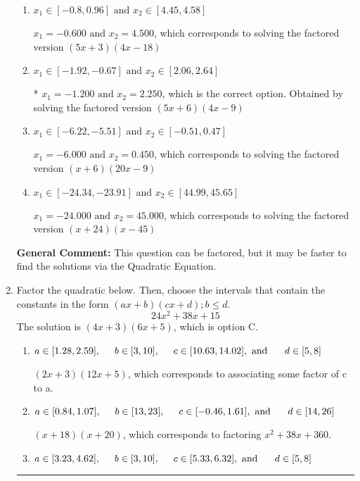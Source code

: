 \documentclass{extbook}[14pt]
\newcommand{\litem}[1]{\item #1

\rule{\textwidth}{0.4pt}}
\begin{document}
\begin{enumerate}
{\begin{enumerate}[label=\Alph*.]
$x_1 = -3.600 \text{ and } x_2 = 0.750$, which corresponds to solving the factored version $(5x + 18)(4x -3)$
\item \( x_1 \in [-0.8, 0.96] \text{ and } x_2 \in [4.45, 4.58] \)

$x_1 = -0.600 \text{ and } x_2 = 4.500$, which corresponds to solving the factored version $(5x + 3)(4x -18)$
\item \( x_1 \in [-1.92, -0.67] \text{ and } x_2 \in [2.06, 2.64] \)

* $x_1 = -1.200 \text{ and } x_2 = 2.250$, which is the correct option. Obtained by solving the factored version $(5x + 6)(4x -9)$
\item \( x_1 \in [-6.22, -5.51] \text{ and } x_2 \in [-0.51, 0.47] \)

$x_1 = -6.000 \text{ and } x_2 = 0.450$, which corresponds to solving the factored version $(x + 6)(20x -9)$
\item \( x_1 \in [-24.34, -23.91] \text{ and } x_2 \in [44.99, 45.65] \)

$x_1 = -24.000 \text{ and } x_2 = 45.000$, which corresponds to solving the factored version $(x + 24)(x -45)$
\end{enumerate}

\textbf{General Comment:} This question can be factored, but it may be faster to find the solutions via the Quadratic Equation.
}
\litem{
Factor the quadratic below. Then, choose the intervals that contain the constants in the form $(ax+b)(cx+d); b \leq d.$
\[ 24x^{2} +38 x + 15 \]The solution is \( (4x + 3)(6x + 5) \), which is option C.\begin{enumerate}[label=\Alph*.]
\item \( a \in [1.28, 2.59], \hspace*{5mm} b \in [3, 10], \hspace*{5mm} c \in [10.63, 14.02], \text{ and } \hspace*{5mm} d \in [5, 8] \)

 $(2x + 3)(12x + 5)$, which corresponds to associating some factor of c to a.
\item \( a \in [0.84, 1.07], \hspace*{5mm} b \in [13, 23], \hspace*{5mm} c \in [-0.46, 1.61], \text{ and } \hspace*{5mm} d \in [14, 26] \)

 $(x + 18)(x + 20)$, which corresponds to factoring $x^{2} +38 x + 360$.
\item \( a \in [3.23, 4.62], \hspace*{5mm} b \in [3, 10], \hspace*{5mm} c \in [5.33, 6.32], \text{ and } \hspace*{5mm} d \in [5, 8] \)


\end{enumerate}}
\end{enumerate}
\end{document}
